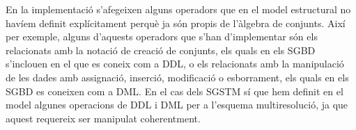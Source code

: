 


En la implementació s'afegeixen alguns operadors que en el model
estructural no havíem definit explícitament perquè ja són propis de
l'àlgebra de conjunts. Així per exemple, alguns d'aquests operadors
que s'han d'implementar són els relacionats amb la notació de creació
de conjunts, %
els quals en els \gls{SGBD} s'inclouen en el que es coneix com a
\gls{DDL}, o els relacionats amb la manipulació de les dades amb
assignació, inserció, modificació o esborrament, els quals en els
\gls{SGBD} es coneixen com a \gls{DML}.  En el cas dels \gls{SGSTM} sí
que hem definit en el model algunes operacions de \gls{DDL} i \gls{DML} per a
l'esquema multiresolució, ja que aquest requereix ser manipulat
coherentment.













